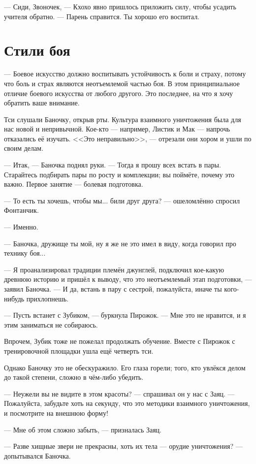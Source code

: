 --- Сиди, Звоночек, --- Кхохо явно пришлось приложить силу, чтобы усадить учителя обратно.
--- Парень справится.
Ты хорошо его воспитал.

\section{Стили боя}

--- Боевое искусство должно воспитывать устойчивость к боли и страху, потому что боль и страх являются неотъемлемой частью боя.
В этом принципиальное отличие боевого искусства от любого другого.
Это последнее, на что я хочу обратить ваше внимание.

Тси слушали Баночку, открыв рты.
Культура взаимного уничтожения была для нас новой и непривычной.
Кое-кто --- например, Листик и Мак --- напрочь отказались её изучать.
<<Это неправильно>>, --- отрезали они хором и ушли по своим делам.

--- Итак, --- Баночка поднял руки.
--- Тогда я прошу всех встать в пары.
Старайтесь подбирать пары по росту и комплекции;
вы поймёте, почему это важно.
Первое занятие --- болевая подготовка.

--- То есть ты хочешь, чтобы мы... били друг друга? --- ошеломлённо спросил Фонтанчик.

--- Именно.

--- Баночка, дружище ты мой, ну я же не это имел в виду, когда говорил про технику боя...

--- Я проанализировал традиции племён джунглей, подключил кое-какую древнюю историю и пришёл к выводу, что это неотъемлемый этап подготовки, --- заявил Баночка.
--- И да, встань в пару с сестрой, пожалуйста, иначе ты кого-нибудь прихлопнешь.

--- Пусть встанет с Зубиком, --- буркнула Пирожок.
--- Мне это не нравится, и я этим заниматься не собираюсь.

Впрочем, Зубик тоже не пожелал продолжать обучение.
Вместе с Пирожок с тренировочной площадки ушла ещё четверть тси.

Однако Баночку это не обескуражило.
Его глаза горели;
того, кто увлёкся делом до такой степени, сложно в чём-либо убедить.

--- Неужели вы не видите в этом красоты? --- спрашивал он у нас с Заяц.
--- Пожалуйста, забудьте хоть на секунду, что это методики взаимного уничтожения, и посмотрите на внешнюю форму!

--- Мне об этом сложно забыть, --- призналась Заяц.

--- Разве хищные звери не прекрасны, хоть их тела --- орудие уничтожения? --- допытывался Баночка.

